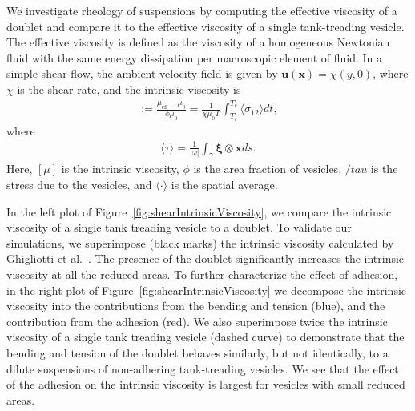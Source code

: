 \documentclass[prf,superscriptaddress,showpacs]{revtex4-1}
\newcommand{\uu}{\mathbf{u}}
\newcommand{\xx}{\mathbf{x}}
\newcommand{\xxi}{\boldsymbol{\xi}}
\begin{document}
We investigate rheology of suspensions by computing the effective
viscosity of a doublet and compare it to the effective viscosity of a
single tank-treading vesicle. The effective viscosity is defined as the
viscosity of a homogeneous Newtonian fluid with the same energy
dissipation per macroscopic element of fluid.  In a simple shear flow,
the ambient velocity field is given by $\uu(\xx) = \chi(y,0)$, where
$\chi$ is the shear rate, and the intrinsic viscosity is
\begin{align*}
  [\mu]:= \frac{\mu_{\mathrm{eff}} - \mu_0}{\phi \mu_0} = 
  \frac{1}{\chi \mu_0 T} \int_{T_i}^{T_e} 
  \langle \sigma_{12} \rangle dt,
\end{align*}
where
\begin{align*}
  \langle \tau \rangle = \frac{1}{|\omega|} \int_{\gamma}
    \xxi \otimes \xx ds.
\end{align*}
Here, $[\mu]$ is the intrinsic viscosity, $\phi$ is the area fraction of
vesicles, $/tau$ is the stress due to the vesicles, and $\langle \cdot
\rangle$ is the spatial average.

In the left plot of Figure~\ref{fig:shearIntrinsicViscosity}, we compare
the intrinsic viscosity of a single tank treading vesicle to a doublet.
To validate our simulations, we superimpose (black marks) the intrinsic
viscosity calculated by Ghigliotti et
al.~\cite{GhigliottiBibenMisbah2010_JFM}.  The presence of the doublet
significantly increases the intrinsic viscosity at all the reduced
areas.  To further characterize the effect of adhesion, in the right
plot of Figure~\ref{fig:shearIntrinsicViscosity} we decompose the
intrinsic viscosity into the contributions from the bending and tension
(blue), and the contribution from the adhesion (red).  We also
superimpose twice the intrinsic viscosity of a single tank treading
vesicle (dashed curve) to demonstrate that the bending and tension of
the doublet behaves similarly, but not identically, to a dilute
suspensions of non-adhering tank-treading vesicles.  We see that the
effect of the adhesion on the intrinsic viscosity is largest for
vesicles with small reduced areas.
\end{document}
